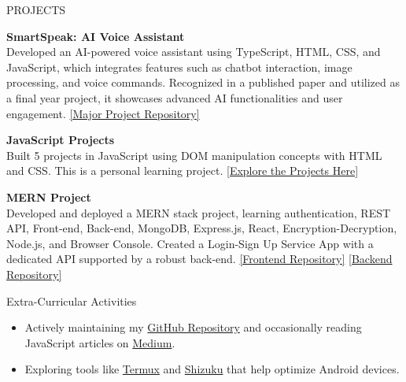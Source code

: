 \documentclass{resume} %
\begin{document}
\begin{rSection}{PROJECTS}

 \textbf{SmartSpeak: AI Voice Assistant} \\
Developed an AI-powered voice assistant using TypeScript, HTML, CSS, and JavaScript, which integrates features such as chatbot interaction, image processing, and voice commands. Recognized in a published paper and utilized as a final year project, it showcases advanced AI functionalities and user engagement. \href{https://github.com/vaan-github/SMART-SPEAK-AI-VOICE-ASSISTANT}{[Major Project Repository]}

\item \textbf{JavaScript Projects} \\ 
Built 5 projects in JavaScript using DOM manipulation concepts with HTML and CSS. This is a personal learning project. \href{https://github.com/vaan-github/JavaScript/tree/main/7_Projects}{[Explore the Projects Here]}

\item \textbf{MERN Project} \\ 
Developed and deployed a MERN stack project, learning authentication, REST API, Front-end, Back-end, MongoDB, Express.js, React, Encryption-Decryption, Node.js, and Browser Console. Created a Login-Sign Up Service App with a dedicated API supported by a robust back-end. \href{https://github.com/vaan-github/mern_login_signup_react-native.git}{[Frontend Repository]} \href{https://github.com/vaan-github/Server_mern_login_signup_react-native.git}{[Backend Repository]}

\end{rSection}


\begin{rSection}{Extra-Curricular Activities} 

\begin{itemize}
    \item Actively maintaining my \href{https://github.com/vaan-github}{GitHub Repository} and occasionally reading JavaScript articles on \href{https://medium.com/}{Medium}.
    \item Exploring tools like \href{https://github.com/termux}{Termux} and \href{https://github.com/RikkaApps/Shizuku}{Shizuku} that help optimize Android devices.
\end{itemize}

\end{rSection}
\end{document}

